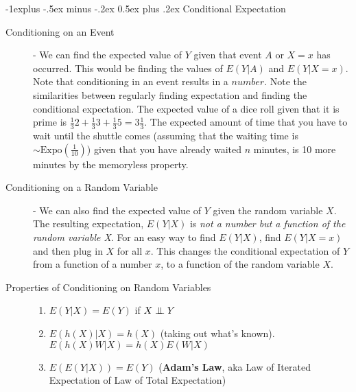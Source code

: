 \documentclass[10pt,landscape]{article}
\makeatletter
\theoremstyle{definition}
\newcommand\independent{\protect\mathpalette{\protect\independenT}{\perp}}
\def\independenT#1#2{\mathrel{\setbox0\hbox{$#1#2$}%
    \copy0\kern-\wd0\mkern4mu\box0}}
\newcommand{\Expo}{\textrm{Expo}}
\renewcommand{\subsection}{\@startsection{subsection}{2}{0mm}%
                                {-1explus -.5ex minus -.2ex}%
                                {0.5ex plus .2ex}%
                                {\normalfont\normalsize\bfseries}}
\makeatother
\begin{document}
\begin{multicols}{3}
\subsection{Conditional Expectation}
\begin{description}
    \item[Conditioning on an Event] - We can find the expected value of $Y$ given that event $A$ or $X=x$ has occurred. This would be finding the values of $E(Y|A)$ and $E(Y|X = x)$. Note that conditioning in an event results in a $number$. Note the similarities between regularly finding expectation and finding the conditional expectation. The expected value of a dice roll given that it is prime is $\frac{1}{3}2 + \frac{1}{3}3 + \frac{1}{3}5 = 3\frac{1}{3}$. The expected amount of time that you have to wait until the shuttle comes (assuming that the waiting time is $\sim \Expo(\frac{1}{10})$) given that you have already waited $n$ minutes, is 10 more minutes by the memoryless property.
\end{description}
\begin{description}
    \item[Conditioning on a Random Variable] - We can also find the expected value of $Y$ given the random variable $X$. The resulting expectation, $E(Y|X)$ is \emph{not a number but a function of the random variable X}. For an easy way to find $E(Y|X)$, find $E(Y|X = x)$ and then plug in $X$ for all $x$. This changes the conditional expectation of $Y$ from a function of a number $x$, to a function of the random variable $X$.
    \item[Properties of Conditioning on Random Variables] \quad
    \begin{enumerate}
        \item $E(Y|X) = E(Y)$ if $X \independent Y$
        \item $E(h(X)|X) = h(X)$ (taking out what's known). \\
            $E(h(X)W|X) = h(X)E(W|X)$
        \item $E(E(Y|X)) = E(Y)$ (\textbf{Adam's Law}, aka Law of Iterated Expectation of Law of Total Expectation)
    \end{enumerate}


\end{description}
\end{multicols}
\end{document}
